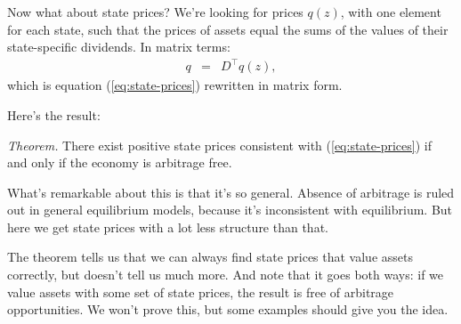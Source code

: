 \documentclass[11pt]{article}
\begin{document}
Now what about state prices?
We're looking for prices $q(z)$, with one element for each state,
such that the prices of assets equal the sums of the values
of their state-specific dividends.
In matrix terms:
\begin{eqnarray}
    q &=&  D^\top q(z),
    \label{eq:state-prices-matrix}
\end{eqnarray}
which is equation (\ref{eq:state-prices}) rewritten in matrix form.

Here's the result:

{\it Theorem.\/}  There exist positive state prices consistent with (\ref{eq:state-prices})
if and only if the economy is arbitrage free.

What's remarkable about this is that it's so general.
Absence of arbitrage is ruled out in general equilibrium models,
because it's inconsistent with equilibrium.
But here we get state prices with a lot less structure than that.

The theorem tells us that we can always find state prices that value assets
correctly, but doesn't tell us much more.
And note that it goes both ways:
if we value assets with some set of state prices,
the result is free of arbitrage opportunities.
We won't prove this, but some examples should give you the idea.
\end{document}
